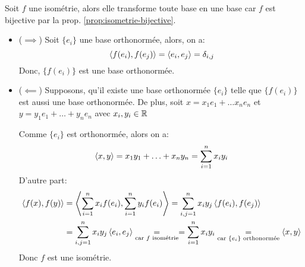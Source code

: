 \begin{preuve}
    Soit $f$ une isométrie, alors elle transforme toute base en une base car  $f$ est bijective par la prop. \ref{prop:isometrie-bijective}. 
    \begin{itemize}
        \item ($\implies$) Soit $\{e_i\}$ une base orthonormée, alors, on a:
             \[
                 \left\langle f(e_i), f(e_j) \right\rangle = \left\langle e_i, e_j \right\rangle = \delta_{i,j}
            \] 
            Donc, $\{f(e_i)\}$ est une base orthonormée.
        \item ($\impliedby$) Supposons, qu'il existe une base orthonormée $\{e_i\}$ telle que  $\{f(e_i)\}$ est aussi une base orthonormée. De plus, soit  $x = x_1e_1 + \ldots x_ne_n$ et $y = y_1e_1 + \ldots + y_ne_n$ avec $x_i, y_i \in \mathbb{R}$
            \par
            Comme $\{e_i\}$ est orthonormée, alors on a:
             \[
                 \left\langle x, y \right\rangle = x_1y_1 + \ldots + x_ny_n = \sum_{i=1}^{n} x_iy_i
            \] 
            D'autre part:
            \begin{align*}
                \left\langle f(x), f(y) \right\rangle &= \left\langle \sum_{i=1}^{n} x_if(e_i), \sum_{i=1}^{n} y_if(e_i) \right\rangle = \sum_{i,j = 1}^{n} x_iy_j\left\langle f(e_i), f(e_j) \right\rangle\\
                                     &= \sum_{i,j=1}^{n} x_iy_j\left\langle e_i, e_j \right\rangle \underset{\text{car } f \text{ isométrie}}{=} = \sum_{i=1}^{n} x_iy_i \underset{\text{car } \{e_i\} \text{ orthonormée}} = \left\langle x, y \right\rangle
            \end{align*}
            Donc $f$ est une isométrie.
    \end{itemize}
\end{preuve}
